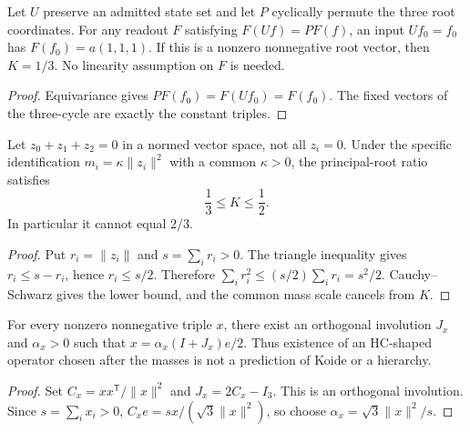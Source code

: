 \begin{proposition}
\label{v480:hc-mass-equivariant-obstruction}
Let $U$ preserve an admitted state set and let $P$ cyclically permute
the three root coordinates. For any readout $F$ satisfying
$F(Uf)=PF(f)$, an input $Uf_0=f_0$ has
$F(f_0)=a(1,1,1)$. If this is a nonzero nonnegative root vector,
then $K=1/3$. No linearity assumption on $F$ is needed.
\end{proposition}
\begin{proof}
Equivariance gives $PF(f_0)=F(Uf_0)=F(f_0)$. The fixed vectors
of the three-cycle are exactly the constant triples.
\end{proof}
\begin{proposition}
\label{v480:hc-mass-triole-bound}
Let $z_0+z_1+z_2=0$ in a normed vector space, not all $z_i=0$.
Under the specific identification $m_i=\kappa\|z_i\|^2$ with a
common $\kappa>0$, the principal-root ratio satisfies
\[
 \frac13\leq K\leq\frac12.
\]
In particular it cannot equal $2/3$.
\end{proposition}
\begin{proof}
Put $r_i=\|z_i\|$ and $s=\sum_i r_i>0$. The triangle inequality
gives $r_i\leq s-r_i$, hence $r_i\leq s/2$. Therefore
$\sum_i r_i^2\leq(s/2)\sum_i r_i=s^2/2$.
Cauchy--Schwarz gives the lower bound, and the common mass scale
cancels from $K$.
\end{proof}
\begin{proposition}
\label{v480:hc-mass-fit-freedom}
For every nonzero nonnegative triple $x$, there exist an orthogonal
involution $J_x$ and $\alpha_x>0$ such that
$x=\alpha_x(I+J_x)e/2$. Thus existence of an HC-shaped operator
chosen after the masses is not a prediction of Koide or a hierarchy.
\end{proposition}
\begin{proof}
Set $C_x=xx^{\mathsf T}/\|x\|^2$ and $J_x=2C_x-I_3$.
This is an orthogonal involution. Since $s=\sum_i x_i>0$,
$C_xe=sx/(\sqrt3\|x\|^2)$, so choose
$\alpha_x=\sqrt3\|x\|^2/s$.
\end{proof}
